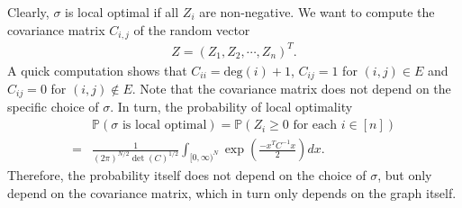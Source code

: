 \documentclass[10pt]{article}
\newcommand{\p}{\mathbb{P}}
\newenvironment{Proof of lemma}{\noindent{\bf Proof of Lemma}}{\hfill$\Box$\newline}
\newenvironment{Proof of claim}{\noindent{\bf Proof of claim}}{\hfill$\Box$\newline}
\newenvironment{Proof of theorem}{\noindent{\bf Proof of Theorem}}{\hfill\scriptsize{$\Box$}\newline}
\newenvironment{Proof of theorems}{\noindent{\bf Proof of Theorems}}{\hfill$\Box$\newline}
\newenvironment{Proof of proposition}{\noindent{\bf Proof of Proposition}}{\hfill$\Box$\newline}
\newenvironment{Proof of propositions}{\noindent{\bf Proof of Propositions}}{\hfill$\Box$\newline}
\newenvironment{Proof of exercise}{\noindent{\it Proof of Exercise:}}{\hfill$\Box$}
\numberwithin{equation}{section}
\begin{document}
Clearly, $\sigma$ is local optimal if all $Z_i$ are non-negative. We want to compute the covariance matrix $C_{i,j}$ of the random vector
\begin{align}
    Z = (Z_1,Z_2,\cdots,Z_n)^{T}.
\end{align}
A quick computation shows that $C_{ii} = \text{deg}(i)+1$, $C_{ij}=1$ for $(i,j) \in E$ and $C_{ij}=0$ for $(i,j) \notin E$. Note that the covariance matrix does not depend on the specific choice of $\sigma$. In turn, the probability of local optimality
\begin{align} \label{lo_prob}
    &\p(\sigma \text{ is local optimal}) = \p(Z_i \geq 0 \text{ for each } i \in [n]) \nonumber \\
    =& \frac{1}{(2\pi)^{N/2}\det(C)^{1/2}}\int_{[0,\infty)^N} \exp\left(\frac{-x^{T}C^{-1}x}{2}\right)dx.
\end{align}
Therefore, the probability itself does not depend on the choice of $\sigma$, but only depend on the covariance matrix, which in turn only depends on the graph itself.
\end{document}

